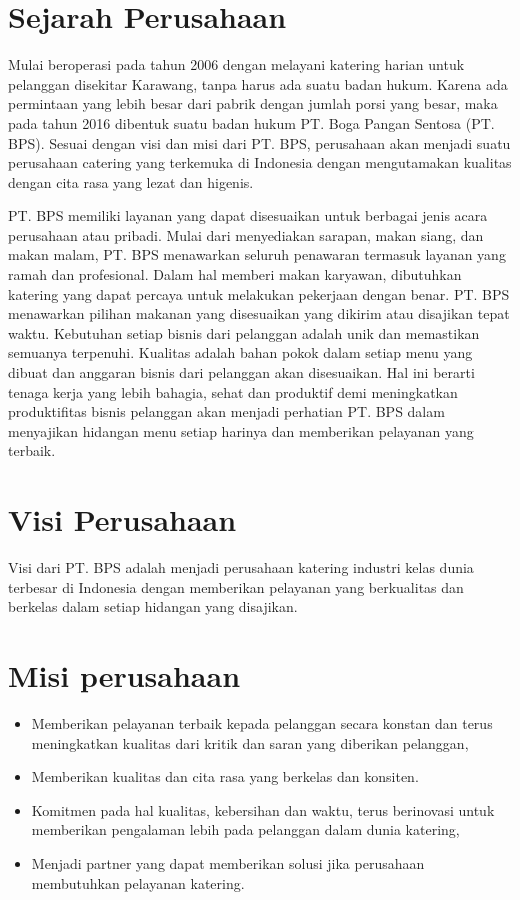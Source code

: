 
\section{Sejarah Perusahaan}

Mulai beroperasi pada tahun 2006 dengan melayani katering harian untuk pelanggan disekitar Karawang, 
tanpa harus ada suatu badan hukum. Karena ada permintaan yang lebih besar dari pabrik dengan jumlah porsi 
yang besar, maka pada tahun 2016 dibentuk suatu badan hukum PT. Boga Pangan Sentosa (PT. BPS). 
Sesuai dengan visi dan misi dari PT. BPS, perusahaan akan menjadi suatu perusahaan catering yang 
terkemuka di Indonesia dengan mengutamakan kualitas dengan cita rasa yang lezat dan higenis. 

PT. BPS memiliki layanan yang dapat disesuaikan untuk berbagai jenis acara perusahaan atau 
pribadi. Mulai dari menyediakan sarapan, makan siang, dan makan malam, 
PT. BPS menawarkan seluruh penawaran termasuk layanan yang ramah dan profesional. 
Dalam hal memberi makan karyawan, dibutuhkan katering yang dapat percaya untuk melakukan 
pekerjaan dengan benar.  PT. BPS menawarkan pilihan makanan yang disesuaikan yang dikirim 
atau disajikan tepat waktu. Kebutuhan setiap bisnis dari pelanggan adalah unik dan memastikan 
semuanya terpenuhi. Kualitas adalah bahan pokok dalam setiap menu yang dibuat dan anggaran bisnis 
dari pelanggan akan disesuaikan. Hal ini berarti tenaga kerja yang lebih bahagia, sehat dan produktif 
demi meningkatkan produktifitas bisnis pelanggan akan menjadi perhatian 
PT. BPS dalam menyajikan hidangan menu setiap harinya dan memberikan pelayanan yang terbaik.\

\section{Visi Perusahaan}

Visi dari PT. BPS adalah menjadi perusahaan katering industri kelas dunia terbesar 
di Indonesia dengan memberikan 
pelayanan yang berkualitas dan berkelas dalam setiap hidangan yang disajikan.

\section{Misi perusahaan}
\begin{itemize}
\item Memberikan pelayanan terbaik kepada pelanggan secara konstan 
dan terus meningkatkan kualitas dari kritik dan saran yang diberikan pelanggan,
\item Memberikan kualitas dan cita rasa yang berkelas dan konsiten. 
\item Komitmen pada hal kualitas, kebersihan dan waktu, terus 
berinovasi untuk memberikan pengalaman lebih pada pelanggan dalam dunia katering, 
\item Menjadi partner yang dapat memberikan solusi jika perusahaan membutuhkan pelayanan katering.
\end{itemize}

